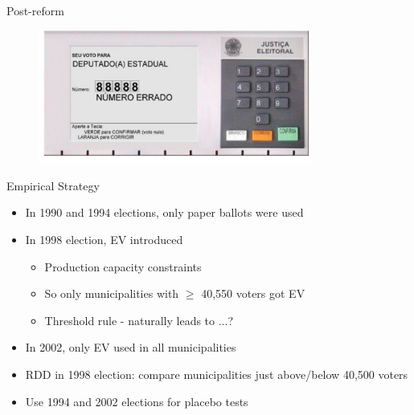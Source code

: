 \documentclass[11pt,notes=hide,aspectratio=169,mathserif]{beamer}
\begin{document}
\begin{frame}{Post-reform}
\begin{figure}
\centering
\includegraphics[width=0.8\textwidth]{inputs/fig4.png}
\end{figure}
\end{frame}

\begin{frame}{Empirical Strategy}

\begin{itemize}
\item In 1990 and 1994 elections, only paper ballots were used
\item In 1998 election, EV introduced 
\begin{itemize}
    \item Production capacity constraints 
    \item So only municipalities with $\geq$ 40,550 voters got EV 
    \item Threshold rule - naturally leads to ...?
\end{itemize}
\item In 2002, only EV used in all municipalities
\pause \item RDD in 1998 election: compare municipalities just above/below 40,500 voters
\pause \item Use 1994 and 2002 elections for placebo tests 
\end{itemize}
\end{frame}
\end{document}
